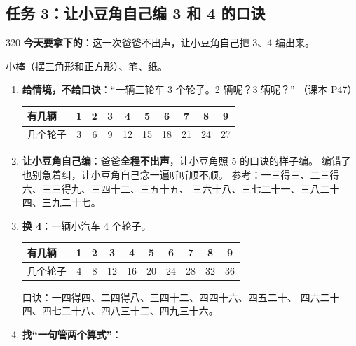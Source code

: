 \subsection{任务 3：让小豆角自己编 3 和 4 的口诀}

\begin{lesson}{3}{20}
\textbf{今天要拿下的}：这一次爸爸不出声，让小豆角自己把 3、4 编出来。

\begin{materials}
小棒（摆三角形和正方形）、笔、纸。
\end{materials}

\begin{enumerate}
  \item \textbf{给情境，不给口诀}：“一辆三轮车 3 个轮子。2 辆呢？3 辆呢？”
        （课本 P47）
        \begin{center}
        \small
        \begin{tabular}{@{}l*{9}{c}@{}}
        \toprule
        有几辆 & 1 & 2 & 3 & 4 & 5 & 6 & 7 & 8 & 9 \\
        \midrule
        几个轮子 & 3 & 6 & 9 & 12 & 15 & 18 & 21 & 24 & 27 \\
        \bottomrule
        \end{tabular}
        \end{center}
  \item \textbf{让小豆角自己编}：爸爸\textbf{全程不出声}，让小豆角照 5 的口诀的样子编。
        编错了也别急着纠，让小豆角自己念一遍听听顺不顺。
        参考：一三得三、二三得六、三三得九、三四十二、三五十五、
        三六十八、三七二十一、三八二十四、三九二十七。
  \item \textbf{换 4}：一辆小汽车 4 个轮子。
        \begin{center}
        \small
        \begin{tabular}{@{}l*{9}{c}@{}}
        \toprule
        有几辆 & 1 & 2 & 3 & 4 & 5 & 6 & 7 & 8 & 9 \\
        \midrule
        几个轮子 & 4 & 8 & 12 & 16 & 20 & 24 & 28 & 32 & 36 \\
        \bottomrule
        \end{tabular}
        \end{center}
        口诀：一四得四、二四得八、三四十二、四四十六、四五二十、
        四六二十四、四七二十八、四八三十二、四九三十六。
  \item \textbf{找“一句管两个算式”}：
        \begin{center}
        \small
        \begin{tabular}{@{}lll@{}}

\end{tabular}
\end{center}
\end{enumerate}
\end{lesson}
